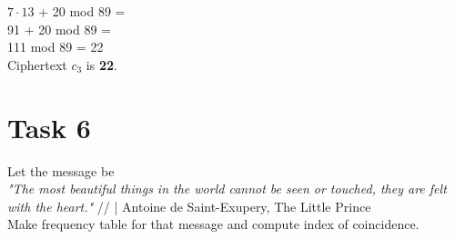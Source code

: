 \documentclass[12pt]{article}
\begin{document}
\noindent $7 \cdot 13$ + 20 mod 89 = \\
91 + 20 mod 89 = \\
111 mod 89 = 22 \\

\noindent Ciphertext $c_3$ is \textbf{22}.


\section*{Task 6}

Let the message be \\

\noindent \textit{"The most beautiful things in the world cannot be seen or touched, 
they are felt with the heart."} // | Antoine de Saint-Exupery, The Little Prince \\

\noindent Make frequency table for that message and compute index of coincidence. \\
\end{document}
